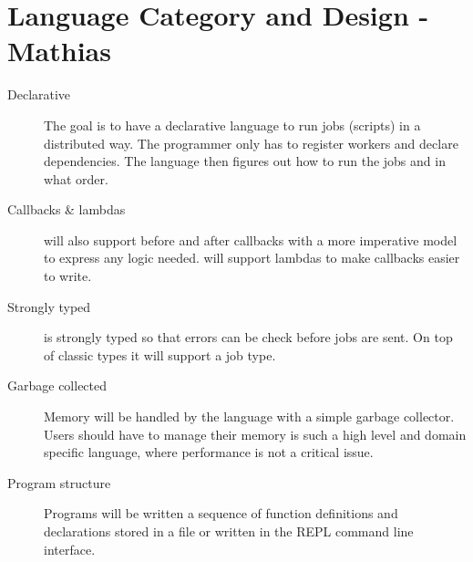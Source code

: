 \section{Language Category and Design - Mathias}
\label{sect:desg}
\begin{description}
\item[Declarative] The goal is to have a declarative language to run jobs
(scripts) in a distributed way. The programmer only has to register workers and
declare dependencies. The language then figures out how to run the jobs and in
what order.
\item[Callbacks & lambdas] \lang will also support before and after callbacks
with a more imperative model to express any logic needed. \lang will support
lambdas to make callbacks easier to write.
\item[Strongly typed] \lang is strongly typed so that errors can be check
before jobs are sent. On top of classic types it will support a job type.
\item[Garbage collected] Memory will be handled by the language with a simple
garbage collector. Users should have to manage their memory is such a high
level and domain specific language, where performance is not a critical issue.
\item[Program structure] Programs will be written a sequence of function
definitions and declarations stored in a file or written in the REPL command line
interface.
\end{description}
